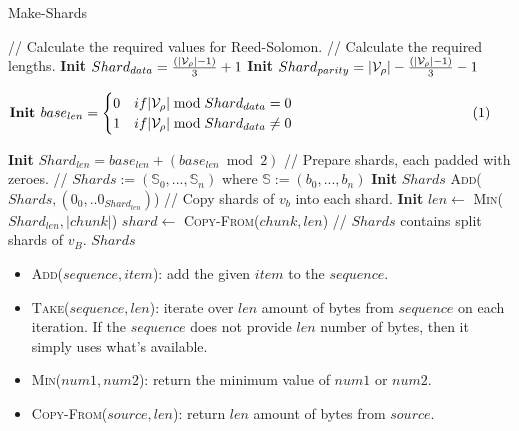 \begin{algorithm}[H]
  \caption[]{\sc Make-Shards}
  \label{algo-make-shards}
  \begin{algorithmic}[1]
    \Statex // Calculate the required values for Reed-Solomon.
    \Statex // Calculate the required lengths.
    \State \textbf{Init} $Shard_{data} = \frac{(|\mathcal{V}_\rho| - 1)}{3} + 1$
    \State \textbf{Init} $Shard_{parity} = |\mathcal{V}_\rho| - \frac{(|\mathcal{V}_\rho| - 1)}{3} - 1$
    \State $\vcenter{
      \begin{flalign*}
        &\textbf{Init } base_{len} =
        \begin{cases}
          0 & if |\paraValidSet| \bmod{Shard_{data}} = 0 \\
          1 & if |\paraValidSet| \bmod{Shard_{data}} \neq 0
        \end{cases}&
      \end{flalign*}
    }$
    \State \textbf{Init} $Shard_{len} = base_{len} + (base_{len} \bmod{2})$
    \Statex
    \Statex // Prepare shards, each padded with zeroes.
    \Statex // $Shards := (\mathbb{S}_0,...,\mathbb{S}_n)$ where $\mathbb{S} := (b_0,...,b_n)$
    \State \textbf{Init} $Shards$
      \State \textsc{Add}($Shards, (0_0, ..0_{Shard_{len}})$)
    \EndFor
    \Statex
    \Statex // Copy shards of $v_b$ into each shard.
      \State \textbf{Init} $len \leftarrow$ \textsc{Min}($Shard_{len}, |chunk|$)
      \State $shard \leftarrow$ \textsc{Copy-From}($chunk, len$)
    \EndFor
    \Statex
    \Statex // $Shards$ contains split shards of $v_B$.
    \State \Return $Shards$
  \end{algorithmic}
\end{algorithm}

\begin{itemize}
  \item \textsc{Add($sequence, item$)}: add the given $item$ to the $sequence$.
  \item \textsc{Take($sequence, len$)}: iterate over $len$ amount of bytes from
  $sequence$ on each iteration. If the $sequence$ does not provide $len$ number
  of bytes, then it simply uses what's available.
  \item \textsc{Min($num1, num2$)}: return the minimum value of $num1$ or
  $num2$.
  \item \textsc{Copy-From($source, len$)}: return $len$ amount of bytes from
  $source$.
\end{itemize}

